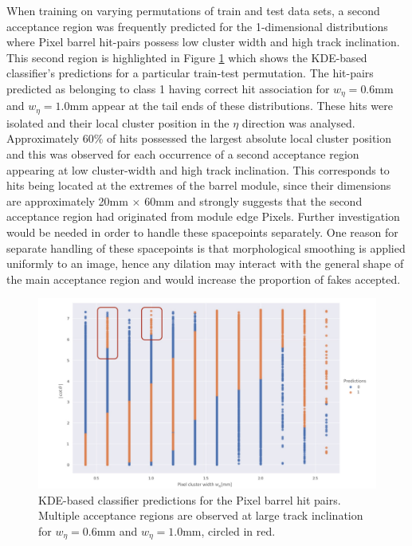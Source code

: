 When training on varying permutations of train and test data sets, a second acceptance region was frequently predicted for the 1-dimensional distributions where Pixel barrel hit-pairs possess low cluster width and high track inclination. This second region is highlighted in Figure \ref{fig:multiple-acceptance} which shows the KDE-based classifier's predictions for a particular train-test permutation. The hit-pairs predicted as belonging to class 1 having correct hit association for $w_{\eta} = 0.6$mm and $w_{\eta} = 1.0$mm appear at the tail ends of these distributions. These hits were isolated and their local cluster position in the $\eta$ direction was analysed. Approximately 60\% of hits possessed the largest absolute local cluster position and this was observed for each occurrence of a second acceptance region appearing at low cluster-width and high track inclination. This corresponds to hits being located at the extremes of the barrel module, since their dimensions are approximately 20mm $\times$ 60mm \cite{pixel-module-dimensions} and strongly suggests that the second acceptance region had originated from module edge Pixels. Further investigation would be needed in order to handle these spacepoints separately. One reason for separate handling of these spacepoints is that morphological smoothing is applied uniformly to an image, hence any dilation may interact with the general shape of the main acceptance region and would increase the proportion of fakes accepted.

\begin{figure}[!htbp]
\centering
\includegraphics[width=0.88\linewidth]{images/4-ml-based-predictor/Multiple_acceptance_regions.pdf}
\caption{KDE-based classifier predictions for the Pixel barrel hit pairs. Multiple acceptance regions are observed at large track inclination for $w_{\eta} = 0.6$mm and $w_{\eta} = 1.0$mm, circled in red.}
\label{fig:multiple-acceptance}
\end{figure}


